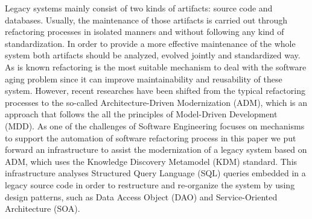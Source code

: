 Legacy systems mainly consist of two kinds of artifacts: source code and databases. Usually, the maintenance of those artifacts is carried out through refactoring processes in isolated manners and without following any kind of standardization. In order to provide a more effective maintenance of the whole system both artifacts should be analyzed, evolved jointly and standardized way. As is known refactoring is the most suitable mechanism to deal with the software aging problem since it can improve maintainability and reusability of these system. However, recent researches have been shifted from the typical refactoring processes to the so-called Architecture-Driven Modernization (ADM), which is an approach that follows the all the principles of Model-Driven Development (MDD). As one of the challenges of Software Engineering focuses on mechanisms to support the automation of software refactoring process in this paper we put forward an infrastructure to assist the modernization of a legacy system based on ADM, which uses the Knowledge Discovery Metamodel (KDM) standard. This infrastructure analyses Structured Query Language (SQL) queries embedded in a legacy source code in order to restructure and re-organize the system by using design patterns, such as Data Access Object (DAO) and Service-Oriented Architecture (SOA). 